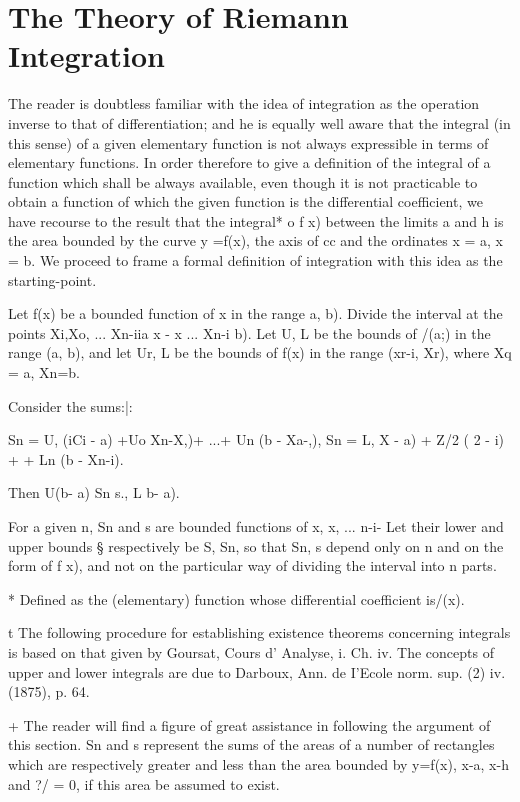 %
%
\chapter{The Theory of Riemann Integration}


The reader is doubtless familiar with the idea of integration as the
operation inverse to that of differentiation; and he is equally well
aware that the integral (in this sense) of a given elementary function
is not always expressible in terms of elementary functions. In order
therefore to give a definition of the integral of a function which
shall be always available, even though it is not practicable to obtain
a function of which the given function is the differential
coefficient, we have recourse to the result that the integral* o f x)
between the limits a and h is the area bounded by the curve y =f(x),
the axis of cc and the ordinates x = a, x = b. We proceed to frame a
formal definition of integration with this idea as the starting-point.


Let f(x) be a bounded function of x in the range a, b). Divide the
interval at the points Xi,Xo, ... Xn-iia x - x ... Xn-i b). Let U, L
be the bounds of /(a;) in the range (a, b), and let Ur, L be the
bounds of f(x) in the range (xr-i, Xr), where Xq = a, Xn=b.

Consider the sums:|:

Sn = U, (iCi - a) +Uo Xn-X,)+ ...+ Un (b - Xa-,), Sn = L, X - a) + Z/2
( 2 - i) +    + Ln (b - Xn-i).

Then U(b- a) Sn s., L b- a).

For a given n, Sn and s are bounded functions of x, x, ... n-i- Let
their lower and upper bounds § respectively be S, Sn, so that Sn, s
depend only on n and on the form of f x), and not on the particular
way of dividing the interval into n parts.

* Defined as the (elementary) function whose differential coefficient
is/(x).

t The following procedure for establishing existence theorems
concerning integrals is based on that given by Goursat, Cours d'
Analyse, i. Ch. iv. The concepts of upper and lower integrals are due
to Darboux, Ann. de I'Ecole norm. sup. (2) iv. (1875), p. 64.

+ The reader will find a figure of great assistance in following the
argument of this section. Sn and s represent the sums of the areas of
a number of rectangles which are respectively greater and less than
the area bounded by y=f(x), x-a, x-h and ?/ = 0, if this area be
assumed to exist.

